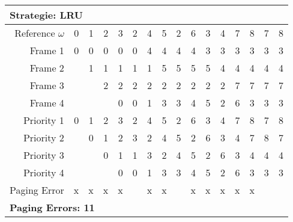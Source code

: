 \documentclass[a4paper, 11pt]{article}
\begin{document}
      \begin{center}
      \begin{tabular}{|r||r|r|r|r|r|r|r|r|r|r|r|r|r|r|r|}
            \multicolumn{16}{l}{\textbf{Strategie: LRU}}\\
            \hline
                  Reference $\omega$ & 0 & 1 & 2 & 3 & 2 & 4 & 5 & 2 & 6 & 3 & 4 & 7 & 8 & 7 & 8 \\
            \hline\hline
                  Frame 1    &0&0&0&0&0&4&4&4&4&3&3&3&3&3&3   \\\hline
                  Frame 2    &&1&1&1&1&1&5&5&5&5&4&4&4&4&4   \\\hline
                  Frame 3    &&&2&2&2&2&2&2&2&2&2&7&7&7&7   \\\hline
                  Frame 4    &&&&0&0&1&3&3&4&5&2&6&3&3&3   \\
            \hline\hline
                  Priority 1 &0&1&2&3&2&4&5&2&6&3&4&7&8&7&8   \\\hline
                  Priority 2 &&0&1&2&3&2&4&5&2&6&3&4&7&8&7   \\\hline
                  Priority 3 &&&0&1&1&3&2&4&5&2&6&3&4&4&4   \\\hline
                  Priority 4 &&&&0&0&1&3&3&4&5&2&6&3&3&3   \\
            \hline\hline
                  Paging Error  &x&x&x&x&&x&x&&x&x&x&x&x&&   \\
            \hline
            \multicolumn{16}{l}{\textbf{Paging Errors: 11}}\\
      \end{tabular}
      \end{center}
\end{document}
